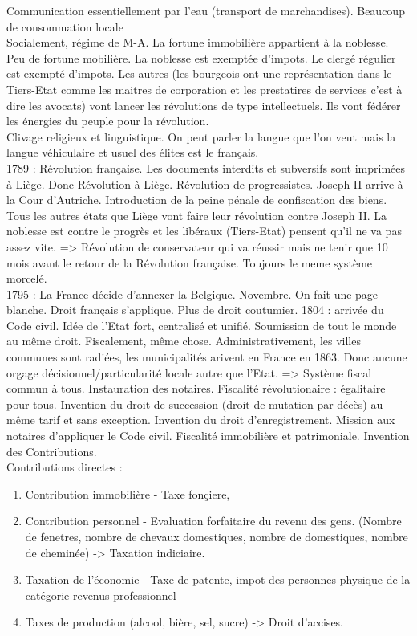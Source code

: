 \documentclass{book}
\begin{document}
Communication essentiellement par l'eau (transport de marchandises). Beaucoup de consommation locale\\

Socialement, régime de M-A. La fortune immobilière appartient à la noblesse. Peu de fortune mobilière. La noblesse est exemptée d'impots. Le clergé régulier est exempté d'impots. Les autres (les bourgeois ont une représentation dans le Tiers-Etat comme les maitres de corporation et les prestatires de services c'est à dire les avocats) vont lancer les révolutions de type intellectuels. Ils vont fédérer les énergies du peuple pour la révolution.\\

Clivage religieux et linguistique. On peut parler la langue que l'on veut mais la langue véhiculaire et usuel des élites est le français.\\

1789 : Révolution française. Les documents interdits et subversifs sont imprimées à Liège. Donc Révolution à Liège. Révolution de progressistes. Joseph II arrive à la Cour d'Autriche. Introduction de la peine pénale de confiscation des biens. Tous les autres états que Liège vont faire leur révolution contre Joseph II. La noblesse est contre le progrès et les libéraux (Tiers-Etat) pensent qu'il ne va pas assez vite. => Révolution de conservateur qui va réussir mais ne tenir que 10 mois avant le retour de la Révolution française. Toujours le meme système morcelé.\\

1795 : La France décide d'annexer la Belgique. Novembre. On fait une page blanche. Droit français s'applique. Plus de droit coutumier. 1804 : arrivée du Code civil. Idée de l'Etat fort, centralisé et unifié. Soumission de tout le monde au même droit. Fiscalement, même chose. Administrativement, les villes communes sont radiées, les municipalités arivent en France en 1863. Donc aucune orgage décisionnel/particularité locale autre que l'Etat. => Système fiscal commun à tous. Instauration des notaires. Fiscalité révolutionaire : égalitaire pour tous. Invention du droit de succession (droit de mutation par décès) au même tarif et sans exception. Invention du droit d'enregistrement. Mission aux notaires d'appliquer le Code civil. Fiscalité immobilière et patrimoniale. Invention des Contributions.\\

Contributions directes :

\begin{enumerate}
\item Contribution immobilière - Taxe fonçiere, 
\item Contribution personnel - Evaluation forfaitaire du revenu des gens. (Nombre de fenetres, nombre de chevaux domestiques, nombre de domestiques, nombre de cheminée) -> Taxation indiciaire.
\item Taxation de l'économie - Taxe de patente, impot des personnes physique de la catégorie revenus professionnel
\item Taxes de production (alcool, bière, sel, sucre) -> Droit d'accises.
\end{enumerate}
\end{document}
